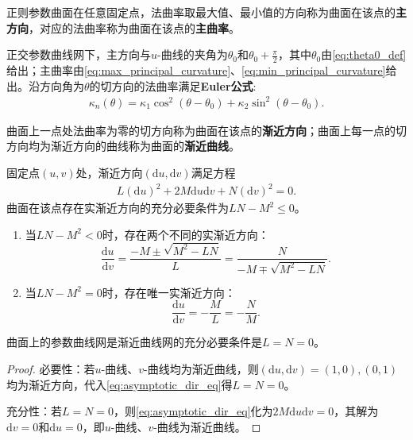 \documentclass[../../main.tex]{subfiles}%
\begin{document}
\begin{definition}
正则参数曲面在任意固定点，法曲率取最大值、最小值的方向称为曲面在该点的\textbf{主方向}，对应的法曲率称为曲面在该点的\textbf{主曲率}。
\end{definition}

\begin{proposition}
正交参数曲线网下，主方向与$u$-曲线的夹角为$\theta_0$和$\theta_0+\frac{\pi}{2}$，其中$\theta_0$由\eqref{eq:theta0_def}给出；主曲率由\eqref{eq:max_principal_curvature}、\eqref{eq:min_principal_curvature}给出。沿方向角为$\theta$的切方向的法曲率满足\textbf{Euler公式}:
\begin{align}
\kappa_n(\theta)=\kappa_1\cos^2(\theta-\theta_0)+\kappa_2\sin^2(\theta-\theta_0).\label{eq:euler_formula112121}
\end{align}
\end{proposition}

\begin{definition}
曲面上一点处法曲率为零的切方向称为曲面在该点的\textbf{渐近方向}；曲面上每一点的切方向均为渐近方向的曲线称为曲面的\textbf{渐近曲线}。
\end{definition}

固定点$(u,v)$处，渐近方向$(\mathrm{d}u,\mathrm{d}v)$满足方程
\begin{align}
L(\mathrm{d}u)^2+2M\mathrm{d}u\mathrm{d}v+N(\mathrm{d}v)^2=0.\label{eq:asymptotic_dir_eq}
\end{align}
曲面在该点存在实渐近方向的充分必要条件为$LN-M^2\leqslant0$。
\begin{enumerate}[(1)]
\item 当$LN-M^2<0$时，存在两个不同的实渐近方向：
$$\frac{\mathrm{d}u}{\mathrm{d}v}=\frac{-M\pm\sqrt{M^2-LN}}{L}=\frac{N}{-M\mp\sqrt{M^2-LN}}.$$
\item 当$LN-M^2=0$时，存在唯一实渐近方向：
$$\frac{\mathrm{d}u}{\mathrm{d}v}=-\frac{M}{L}=-\frac{N}{M}.$$
\end{enumerate}

\begin{theorem}
曲面上的参数曲线网是渐近曲线网的充分必要条件是$L=N=0$。
\end{theorem}
\begin{proof}

{\heiti 必要性：}若$u$-曲线、$v$-曲线均为渐近曲线，则$(\mathrm{d}u,\mathrm{d}v)=(1,0),(0,1)$均为渐近方向，代入\eqref{eq:asymptotic_dir_eq}得$L=N=0$。

{\heiti 充分性：}若$L=N=0$，则\eqref{eq:asymptotic_dir_eq}化为$2M\mathrm{d}u\mathrm{d}v=0$，其解为$\mathrm{d}v=0$和$\mathrm{d}u=0$，即$u$-曲线、$v$-曲线为渐近曲线。

\end{proof}
\end{document}
